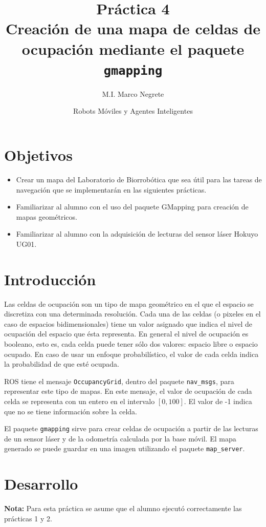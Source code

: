 \documentclass[letterpaper,12pt]{article}
\title{Práctica 4  \\ Creación de una mapa de celdas de ocupación mediante el paquete \texttt{gmapping}}
\author{M.I. Marco Negrete}
\date{Robots Móviles y Agentes Inteligentes}
\begin{document}
\renewcommand{\tablename}{Tabla}
\maketitle
\section*{Objetivos}
\begin{itemize}
\item Crear un mapa del Laboratorio de Biorrobótica que sea útil para las tareas de navegación que se implementarán en las siguientes prácticas. 
\item Familiarizar al alumno con el uso del paquete GMapping para creación de mapas geométricos.
\item Familiarizar al alumno con la adquisición de lecturas del sensor láser Hokuyo UG01.
\end{itemize}

\section{Introducción}
Las celdas de ocupación son un tipo de mapa geométrico en el que el espacio se discretiza con una determinada resolución. Cada una de las celdas (o pixeles en el caso de espacios bidimensionales) tiene un valor asignado que indica el nivel de ocupación del espacio que ésta representa. En general el nivel de ocupación es booleano, esto es, cada celda puede tener sólo dos valores: espacio libre o espacio ocupado. En caso de usar un enfoque probabilístico, el valor de cada celda indica la probabilidad de que esté ocupada. 

ROS tiene el mensaje \texttt{OccupancyGrid}, dentro del paquete \texttt{nav\_msgs}, para representar este tipo de mapas. En este mensaje, el valor de ocupación de cada celda se representa con un entero en el intervalo $[0,100]$. El valor de -1 indica que no se tiene información sobre la celda. 

El paquete \texttt{gmapping} sirve para crear celdas de ocupación a partir de las lecturas de un sensor láser y de la odometría calculada por la base móvil. El mapa generado se puede guardar en una imagen utilizando el paquete \texttt{map\_server}.

\section{Desarrollo}
\textbf{Nota:} Para esta práctica se asume que el alumno ejecutó correctamente las prácticas 1 y 2.
\end{document}
